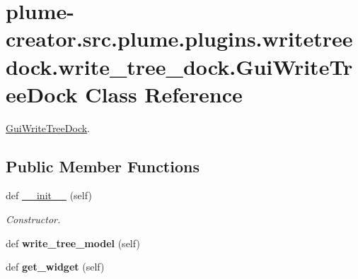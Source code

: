\hypertarget{classplume-creator_1_1src_1_1plume_1_1plugins_1_1writetreedock_1_1write__tree__dock_1_1_gui_write_tree_dock}{}\section{plume-\/creator.src.\+plume.\+plugins.\+writetreedock.\+write\+\_\+tree\+\_\+dock.\+Gui\+Write\+Tree\+Dock Class Reference}
\label{classplume-creator_1_1src_1_1plume_1_1plugins_1_1writetreedock_1_1write__tree__dock_1_1_gui_write_tree_dock}


\hyperlink{classplume-creator_1_1src_1_1plume_1_1plugins_1_1writetreedock_1_1write__tree__dock_1_1_gui_write_tree_dock}{Gui\+Write\+Tree\+Dock}.  


\subsection*{Public Member Functions}
\begin{DoxyCompactItemize}
\item 
def \hyperlink{classplume-creator_1_1src_1_1plume_1_1plugins_1_1writetreedock_1_1write__tree__dock_1_1_gui_write_tree_dock_aaa79e3fc0b150ae48e00f3ecafa051c3}{\+\_\+\+\_\+init\+\_\+\+\_\+} (self)\hypertarget{classplume-creator_1_1src_1_1plume_1_1plugins_1_1writetreedock_1_1write__tree__dock_1_1_gui_write_tree_dock_aaa79e3fc0b150ae48e00f3ecafa051c3}{}\label{classplume-creator_1_1src_1_1plume_1_1plugins_1_1writetreedock_1_1write__tree__dock_1_1_gui_write_tree_dock_aaa79e3fc0b150ae48e00f3ecafa051c3}

\begin{DoxyCompactList}\small\item\em Constructor. \end{DoxyCompactList}\item 
def {\bfseries write\+\_\+tree\+\_\+model} (self)\hypertarget{classplume-creator_1_1src_1_1plume_1_1plugins_1_1writetreedock_1_1write__tree__dock_1_1_gui_write_tree_dock_ae40437997405636cae02cc109998bff1}{}\label{classplume-creator_1_1src_1_1plume_1_1plugins_1_1writetreedock_1_1write__tree__dock_1_1_gui_write_tree_dock_ae40437997405636cae02cc109998bff1}

\item 
def {\bfseries get\+\_\+widget} (self)\hypertarget{classplume-creator_1_1src_1_1plume_1_1plugins_1_1writetreedock_1_1write__tree__dock_1_1_gui_write_tree_dock_a2d6fbde9dc1733bcbded62a75509d740}{}\label{classplume-creator_1_1src_1_1plume_1_1plugins_1_1writetreedock_1_1write__tree__dock_1_1_gui_write_tree_dock_a2d6fbde9dc1733bcbded62a75509d740}

\end{DoxyCompactItemize}
